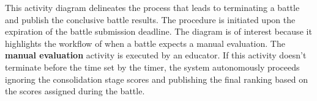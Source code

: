 This activity diagram delineates the process that leads to terminating a battle and publish the conclusive battle results. The procedure is initiated upon the expiration of the battle submission deadline. The diagram is of interest because it highlights the workflow of when a battle expects a manual evaluation. The  \textbf{manual evaluation} activity is executed by an educator. If this activity doesn't terminate before the time set by the timer, the system autonomously proceeds ignoring the consolidation stage scores and publishing the final ranking based on the scores assigned during the battle.
